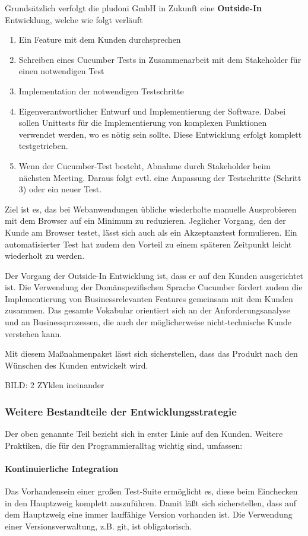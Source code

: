 Grundsätzlich verfolgt die pludoni GmbH in Zukunft eine \textbf{Outside-In} Entwicklung, welche wie folgt verläuft
\begin{enumerate}
\item Ein Feature mit dem Kunden durchsprechen
\item Schreiben eines Cucumber Tests in Zusammenarbeit mit dem Stakeholder für einen notwendigen Test
\item Implementation der notwendigen Testschritte
\item Eigenverantwortlicher Entwurf und Implementierung der Software. Dabei sollen Unittests für die Implementierung von komplexen Funktionen verwendet werden, wo es nötig sein sollte. Diese Entwicklung erfolgt komplett testgetrieben.
\item Wenn der Cucumber-Test besteht, Abnahme durch Stakeholder beim nächsten Meeting. Daraus folgt evtl. eine Anpassung der Testschritte (Schritt 3) oder ein neuer Test.
\end{enumerate}

Ziel ist es, das bei Webanwendungen übliche wiederholte manuelle Ausprobieren mit dem Browser auf ein Minimum zu reduzieren. Jeglicher Vorgang, den der Kunde am Browser testet, lässt sich auch als ein Akzeptanztest formulieren. Ein automatisierter Test hat zudem den Vorteil zu einem späteren Zeitpunkt leicht wiederholt zu werden. 

Der Vorgang der Outside-In Entwicklung ist, dass er auf den Kunden ausgerichtet ist. Die Verwendung der Domänspezifischen Sprache Cucumber fördert zudem die Implementierung von Businessrelevanten Features gemeinsam mit dem Kunden zusammen. Das gesamte Vokabular orientiert sich an der Anforderungsanalyse und an Businessprozessen, die auch der möglicherweise nicht-technische Kunde verstehen kann.

Mit diesem Maßnahmenpaket lässt sich sicherstellen, dass das Produkt nach den Wünschen des Kunden entwickelt wird.


BILD: 2 ZYklen ineinander

\subsubsection{Weitere Bestandteile der Entwicklungsstrategie}

Der oben genannte Teil bezieht sich in erster Linie auf den Kunden. Weitere Praktiken, die für den Programmieralltag wichtig sind, umfassen:

\paragraph{Kontinuierliche Integration} Das Vorhandensein einer großen Test-Suite ermöglicht es, diese beim Einchecken in den Hauptzweig komplett auszuführen. Damit läßt sich sicherstellen, dass auf dem Hauptzweig eine immer lauffähige Version vorhanden ist. Die Verwendung einer Versionsverwaltung, z.B. git, ist obligatorisch.

